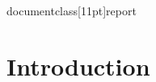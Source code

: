 documentclass[11pt]{report}

\usepackage[margin=1in]{geometry}		%
\usepackage{textgreek}


\section{Introduction}


